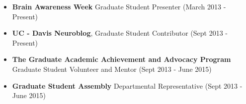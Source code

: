 \documentclass[line,margin,10pt]{res}
\begin{document}
\begin{resume}
\begin{itemize}[leftmargin=-2pt]
\item[]\textbf{Brain Awareness Week} Graduate Student Presenter (March 2013 - Present)

\item[]\textbf{UC - Davis Neuroblog}, Graduate Student Contributor (Sept 2013 - Present)

\item[]\textbf{The Graduate Academic Achievement and Advocacy Program} Graduate Student Volunteer and Mentor (Sept 2013 - June 2015)

\item[]\textbf{Graduate Student Assembly} Departmental Representative (Sept 2013 - June 2015)

\end{itemize}
 

\end{resume}
\end{document}
